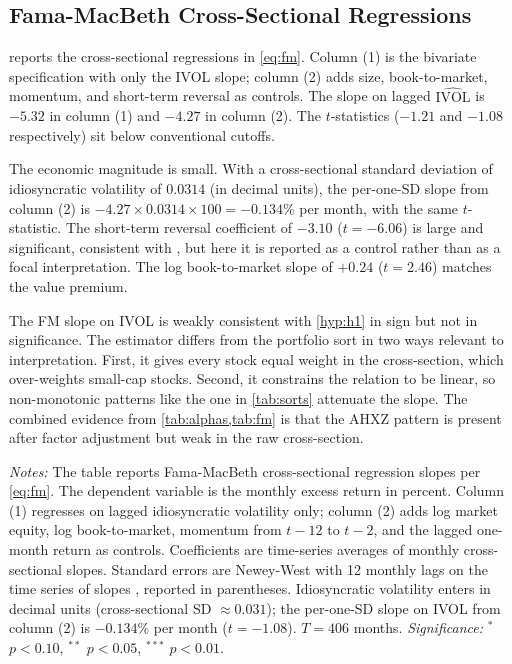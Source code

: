 \documentclass[12pt]{article}
\newcommand{\1}[1]{\mathds{1}\left[#1\right]}
\begin{document}
\subsection{Fama-MacBeth Cross-Sectional Regressions}

 reports the cross-sectional regressions in \eqref{eq:fm}.
Column (1) is the bivariate specification with only the IVOL slope; column
(2) adds size, book-to-market, momentum, and short-term reversal as
controls. The slope on lagged $\widehat{\mathrm{IVOL}}$ is $-5.32$ in column
(1) and $-4.27$ in column (2). The $t$-statistics ($-1.21$ and $-1.08$
respectively) sit below conventional cutoffs.

The economic magnitude is small. With a cross-sectional standard deviation
of idiosyncratic volatility of $0.0314$ (in decimal units), the per-one-SD
slope from column (2) is $-4.27 \times 0.0314 \times 100 = -0.134\%$ per
month, with the same $t$-statistic. The short-term reversal coefficient
of $-3.10$ ($t=-6.06$) is large and significant, consistent with
\citet{huang2010return}, but here it is reported as a control rather than as
a focal interpretation. The log book-to-market slope of $+0.24$ ($t=2.46$)
matches the value premium.

The FM slope on IVOL is weakly consistent with \cref{hyp:h1} in sign but not
in significance. The estimator differs from the portfolio sort in two ways
relevant to interpretation. First, it gives every stock equal weight in the
cross-section, which over-weights small-cap stocks. Second, it constrains
the relation to be linear, so non-monotonic patterns like the one in
\cref{tab:sorts} attenuate the slope. The combined evidence from
\cref{tab:alphas,tab:fm} is that the AHXZ pattern is present after
factor adjustment but weak in the raw cross-section.

\begin{table}[H]
\centering
\begin{threeparttable}
\caption{Fama-MacBeth cross-sectional regressions, 1990--2024}\label{tab:fm}
\small

\begin{tablenotes}\small
\item \textit{Notes:} The table reports Fama-MacBeth cross-sectional
regression slopes per \eqref{eq:fm}. The dependent variable is the monthly
excess return in percent. Column (1) regresses on lagged idiosyncratic
volatility only; column (2) adds log market equity, log book-to-market,
momentum from $t{-}12$ to $t{-}2$, and the lagged one-month return as
controls. Coefficients are time-series averages of monthly cross-sectional
slopes. Standard errors are Newey-West with 12 monthly lags on the time
series of slopes \citep{newey1987simple}, reported in parentheses.
Idiosyncratic volatility enters in decimal units (cross-sectional SD
$\approx 0.031$); the per-one-SD slope on IVOL from column (2) is
$-0.134\%$ per month ($t=-1.08$). $T=406$ months.
\emph{Significance:} $^{*}$ $p<0.10$, $^{**}$ $p<0.05$, $^{***}$ $p<0.01$.
\end{tablenotes}
\end{threeparttable}
\end{table}
\end{document}
